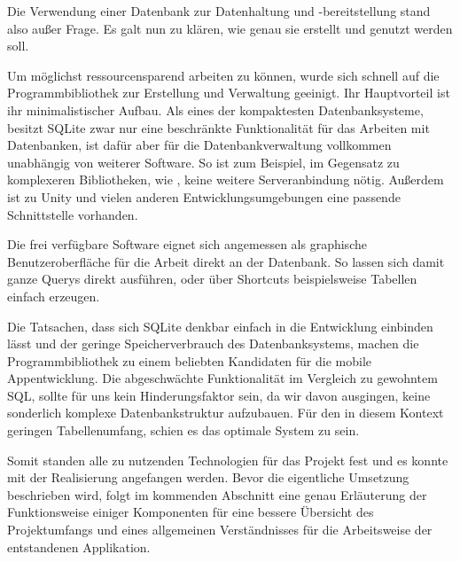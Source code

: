 Die Verwendung einer Datenbank zur Datenhaltung und -bereitstellung stand also außer Frage. Es galt nun zu klären, wie genau sie erstellt und genutzt werden soll.

Um möglichst ressourcensparend arbeiten zu können, wurde sich schnell auf die Programmbibliothek  zur Erstellung und Verwaltung geeinigt. Ihr Hauptvorteil ist ihr minimalistischer Aufbau. Als eines der kompaktesten Datenbanksysteme, besitzt SQLite zwar nur eine beschränkte Funktionalität für das Arbeiten mit Datenbanken, ist dafür aber für die Datenbankverwaltung vollkommen unabhängig von weiterer Software. So ist zum Beispiel, im Gegensatz zu komplexeren Bibliotheken, wie , keine weitere Serveranbindung nötig. Außerdem ist zu Unity und vielen anderen Entwicklungsumgebungen eine passende Schnittstelle vorhanden.

Die frei verfügbare Software  eignet sich angemessen als graphische Benutzeroberfläche für die Arbeit direkt an der Datenbank. So lassen sich damit ganze Querys direkt ausführen, oder über Shortcuts beispielsweise Tabellen einfach erzeugen.

Die Tatsachen, dass sich SQLite denkbar einfach in die Entwicklung einbinden lässt und der geringe Speicherverbrauch des Datenbanksystems, machen die Programmbibliothek zu einem beliebten Kandidaten für die mobile Appentwicklung. Die abgeschwächte Funktionalität im Vergleich zu gewohntem SQL, sollte für uns kein Hinderungsfaktor sein, da wir davon ausgingen, keine sonderlich komplexe Datenbankstruktur aufzubauen. Für den in diesem Kontext geringen Tabellenumfang, schien es das optimale System zu sein. 

Somit standen alle zu nutzenden Technologien für das Projekt fest und es konnte mit der Realisierung angefangen werden. Bevor die eigentliche Umsetzung beschrieben wird, folgt im kommenden Abschnitt eine genau Erläuterung der Funktionsweise einiger Komponenten für eine bessere Übersicht des Projektumfangs und eines allgemeinen Verständnisses für die Arbeitsweise der entstandenen Applikation.